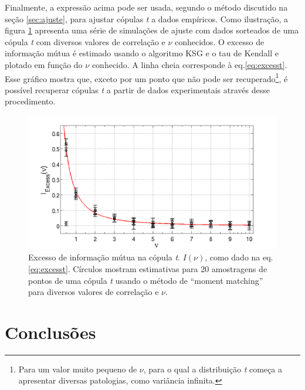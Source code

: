 Finalmente, a expressão acima pode ser usada, segundo o método discutido na seção \ref{sec:ajuste}, para ajustar cópulas \textit{t} a dados empíricos. Como ilustração, a figura \ref{fig:ajuste} apresenta uma série de simulações de ajuste com dados sorteados de uma cópula \textit{t} com diversos valores de correlação e $\nu$ conhecidos. O excesso de informação mútua é estimado usando o algoritmo KSG \cite{Kraskov2004} e o tau de Kendall e plotado em função do $\nu$ conhecido. A linha cheia corresponde à eq.\eqref{eq:excesst}. Esse gráfico mostra que, exceto por um ponto que não pode ser recuperado\footnote{Para um valor muito pequeno de $\nu$, para o qual a distribuição \textit{t} começa a apresentar diversas patologias, como variância infinita.}, é possível recuperar cópulas \textit{t} a partir de dados experimentais através desse procedimento. 
\begin{figure} 
 \centering
 \includegraphics[width =\textwidth]{./figuras/I_Excess.png} 
 \caption[Excesso de informação mútua na cópula \textit{t}]{Excesso de informação mútua na cópula \textit{t}. $I(\nu)$, como dado na eq.\eqref{eq:excesst}. Círculos mostram estimativas para 20 amostragens de pontos de uma cópula \textit{t} usando o método de ``moment matching'' para diversos valores de correlação e $\nu$.}
 \label{fig:ajuste}
\end{figure}
\section{Conclusões}

